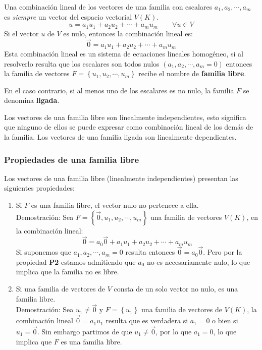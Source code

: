 Una combinación lineal de los vectores de una familia con escalares \(a_1, a_2, \cdots, a_m\) es \textit{siempre} un vector del espacio vectorial \(V(K)\).
\[
  u = a_1 u_1 + a_2 u_2 + \cdots + a_m u_m \qquad \forall u \in V
\]
Si el vector \(u\) de \(V\) es nulo, entonces la combinación lineal es:
\[
  \vec{0} = a_1 u_1 + a_2 u_2 + \cdots + a_m u_m
\]
Esta combinación lineal es un sistema de ecuaciones lineales homogéneo, si al resolverlo resulta que los escalares son todos nulos \((a_1,a_2,\cdots,a_m = 0)\) entonces la familia de vectores \(F=\left\{u_1, u_2, \cdots, u_m \right\}\) recibe el nombre de \textbf{familia libre}.

En el caso contrario, si al menos uno de los escalares es no nulo, la familia \(F\) se denomina \textbf{ligada}.

Los vectores de una familia libre son linealmente independientes, esto significa que ninguno de ellos se puede expresar como combinación lineal de los demás de la familia. Los vectores de una familia ligada son linealmente dependientes.

\subsubsection{Propiedades de una familia libre}

Los vectores de una familia libre (linealmente independientes) presentan las siguientes propiedades:
\begin{enumerate}
  \item Si \(F\) es una familia libre, el vector nulo no pertenece a ella. \\ Demostración: Sea \(F=\left\{\vec{0},u_1, u_2, \cdots, u_m\right\}\) una familia de vectores \(V(K)\), en la combinación lineal: \[
    \vec{0} = a_0 \vec{0} + a_1 u_1 + a_2 u_2 + \cdots + a_m u_m
  \]
  Si suponemos que \(a_1, a_2, \cdots, a_m = 0\) resulta entonces \(\vec{0}=a_0 \vec{0}\). Pero por la propiedad \textbf{P2} estamos admitiendo que \(a_0\) no es necesariamente nulo, lo que implica que la familia no es libre.
  \item Si una familia de vectores de \(V\) consta de un solo vector no nulo, es una familia libre. \\ Demostración: Sea \(u_1 \neq \vec{0}\) y \(F=\left\{u_1\right\}\) una familia de vectores de \(V(K)\), la combinación lineal \(\vec{0} = a_1 u_1\) resulta que es verdadera si \(a_1 = 0\) o bien si \(u_1 = \vec{0}\). Sin embargo partimos de que \(u_1 \neq \vec{0}\), por lo que \(a_1 = 0\), lo que implica que \(F\) es una familia libre.
\end{enumerate}

